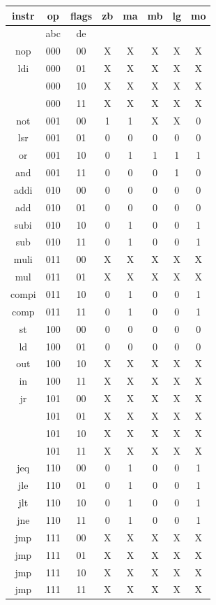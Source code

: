 \documentclass[11pt, a4paper, twoside, titlepage]{article}
\begin{document}
\begin{center}
	\ttfamily
	\begin{tabular}{|c|c|c|c|c|c|c|c|}
		\hline
		instr	& op & flags & zb & ma & mb & lg & mo \\
		\hline
				& abc & de &&&&& \\
		\hline
		nop		& 000 & 00 & X & X & X & X & X \\
		ldi		& 000 & 01 & X & X & X & X & X \\
				& 000 & 10 & X & X & X & X & X \\
				& 000 & 11 & X & X & X & X & X \\
		\hline
		not		& 001 & 00 & 1 & 1 & X & X & 0 \\
		lsr		& 001 & 01 & 0 & 0 & 0 & 0 & 0 \\
		or		& 001 & 10 & 0 & 1 & 1 & 1 & 1 \\
		and		& 001 & 11 & 0 & 0 & 0 & 1 & 0 \\
		\hline
		addi	& 010 & 00 & 0 & 0 & 0 & 0 & 0 \\
		add		& 010 & 01 & 0 & 0 & 0 & 0 & 0 \\
		subi	& 010 & 10 & 0 & 1 & 0 & 0 & 1 \\
		sub		& 010 & 11 & 0 & 1 & 0 & 0 & 1 \\
		\hline
		muli	& 011 & 00 & X & X & X & X & X \\
		mul		& 011 & 01 & X & X & X & X & X \\
		compi	& 011 & 10 & 0 & 1 & 0 & 0 & 1 \\
		comp	& 011 & 11 & 0 & 1 & 0 & 0 & 1 \\
		\hline
		st		& 100 & 00 & 0 & 0 & 0 & 0 & 0 \\
		ld		& 100 & 01 & 0 & 0 & 0 & 0 & 0 \\
		out		& 100 & 10 & X & X & X & X & X \\
		in		& 100 & 11 & X & X & X & X & X \\
		\hline
		jr		& 101 & 00 & X & X & X & X & X \\
				& 101 & 01 & X & X & X & X & X \\
				& 101 & 10 & X & X & X & X & X \\
				& 101 & 11 & X & X & X & X & X \\
		\hline
		jeq		& 110 & 00 & 0 & 1 & 0 & 0 & 1 \\
		jle		& 110 & 01 & 0 & 1 & 0 & 0 & 1 \\
		jlt		& 110 & 10 & 0 & 1 & 0 & 0 & 1 \\
		jne		& 110 & 11 & 0 & 1 & 0 & 0 & 1 \\
		\hline
		jmp		& 111 & 00 & X & X & X & X & X \\
		jmp		& 111 & 01 & X & X & X & X & X \\
		jmp		& 111 & 10 & X & X & X & X & X \\
		jmp		& 111 & 11 & X & X & X & X & X \\
		\hline
	\end{tabular}
\end{center}
\end{document}
